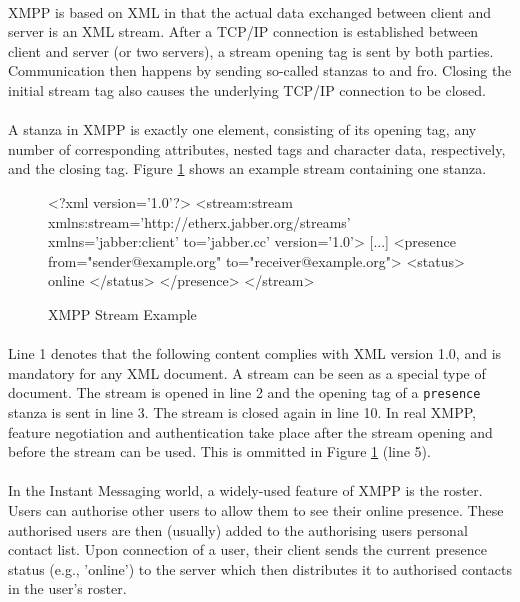 \paragraph{}
XMPP is based on XML in that the actual data exchanged between client and server is an XML stream. After a TCP/IP connection is established between client and server (or two servers), a stream opening tag is sent by both parties. Communication then happens by sending so-called stanzas to and fro. Closing the initial stream tag also causes the underlying TCP/IP connection to be closed.
\paragraph{}
A stanza in XMPP is exactly one element, consisting of its opening tag, any number of corresponding attributes, nested tags and character data, respectively, and the closing tag. Figure \ref{fig:streamExample} shows an example stream containing one stanza.

\begin{figure}[H]
\begin{listing}{1}
<?xml version='1.0'?>
<stream:stream 
      xmlns:stream='http://etherx.jabber.org/streams' 
      xmlns='jabber:client' to='jabber.cc' version='1.0'>
[...]
  <presence from="sender@example.org"
        to="receiver@example.org">
    <status>
      online
    </status>
  </presence>
</stream>
\end{listing}
\caption{XMPP Stream Example}
\label{fig:streamExample}
\end{figure}

\paragraph{}
Line 1 denotes that the following content complies with XML version 1.0, and is mandatory for any XML document. A stream can be seen as a special type of document. The stream is opened in line 2 and the opening tag of a \texttt{presence} stanza is sent in line 3. The stream is closed again in line 10. In real XMPP, feature negotiation and authentication take place after the stream opening and before the stream can be used. This is ommitted in Figure \ref{fig:streamExample} (line 5).
\paragraph{}
In the Instant Messaging world, a widely-used feature of XMPP is the roster. Users can authorise other users to allow them to see their online presence. These authorised users are then (usually) added to the authorising users personal contact list. Upon connection of a user, their client sends the current presence status (e.g., 'online') to the server which then distributes it to authorised contacts in the user's roster.

